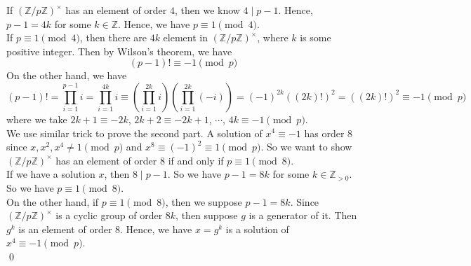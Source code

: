 \documentclass[12pt]{amsart}
\newcommand{\Z}{\mathbb{Z}}
\begin{document}
If $(\Z/p\Z)^\times$ has an element of order $4$, then we know $4\mid p-1$. Hence, $p-1=4k$ for some $k\in\Z$. Hence, we have $p\equiv1\pmod 4$.\\
If $p\equiv 1\pmod 4$, then there are $4k$ element in $(\Z/p\Z)^\times$, where $k$ is some positive integer.
Then by Wilson's theorem, we have 
\[(p-1)!\equiv -1\pmod p\]
On the other hand, we have 
\[(p-1)!=\prod_{i=1}^{p-1}i=\prod_{i=1}^{4k}i\equiv(\prod_{i=1}^{2k}i)(\prod_{i=1}^{2k}(-i))=(-1)^{2k}((2k)!)^2=((2k)!)^2\equiv -1\pmod p\]
where we take $2k+1\equiv -2k$, $2k+2\equiv -2k+1$, $\cdots$, $4k\equiv -1 \pmod p$.\\
We use similar trick to prove the second part. A solution of $x^4\equiv -1$ has order $8$ since $x,x^2,x^4\neq 1\pmod p$ and $x^8\equiv (-1)^2\equiv 1\pmod p$. So we want to show $(\Z/p\Z)^\times$ has an element of order $8$ if and only if $p\equiv 1\pmod 8$.\\
If we have a solution $x$, then $8\mid p-1$. So we have $p-1=8k$ for some $k\in\Z_{>0}$. So we have $p\equiv 1\pmod 8$.\\
On the other hand, if $p\equiv 1\pmod 8$, then we suppose $p-1=8k$. Since $(\Z/p\Z)^\times$ is a cyclic group of order $8k$, then suppose $g$ is a generator of it. Then $g^k$ is an element of order $8$. Hence, we have $x=g^k$ is a solution of $x^4\equiv -1 \pmod p$.
\\\qed\\ 
\end{document}
